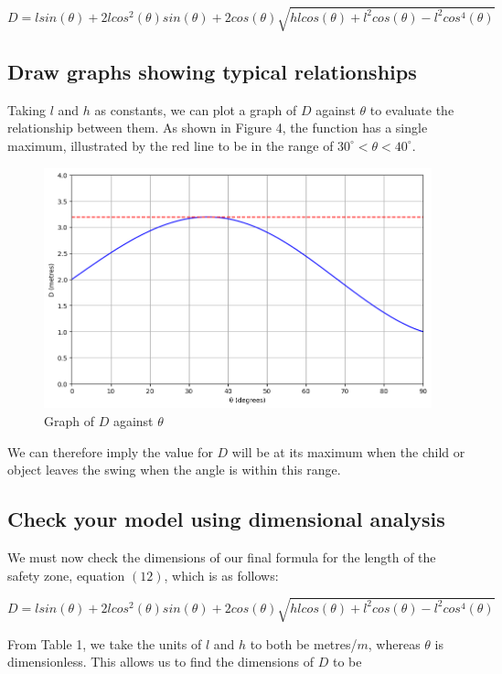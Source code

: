 \documentclass{article}
\begin{document}
\begin{equation}
    D = lsin(\theta) + 2lcos^2(\theta)sin(\theta) + 2cos(\theta)\sqrt{hlcos(\theta) + l^2cos(\theta) - l^2cos^4(\theta)}
\end{equation}

\subsection*{Draw graphs showing typical relationships}
Taking $l$ and $h$ as constants, we can plot a graph of $D$ against $\theta$ to evaluate the relationship between them. As shown in Figure 4, the function has a single maximum, illustrated by the red line to be in the range of $30^\circ < \theta < 40^\circ$.

\begin{figure}[H]
    \centering
    \includegraphics[width=0.70\linewidth]{Fig 4.png}
    \caption{Graph of $D$ against $\theta$ }
    \label{fig: Graph}
\end{figure}

We can therefore imply the value for $D$ will be at its maximum when the child or object leaves the swing when the angle is within this range.

\subsection*{Check your model using dimensional analysis}

We must now check the dimensions of our final formula for the length of the safety zone, equation $(12)$, which is as follows:

\[D = lsin(\theta) + 2lcos^2(\theta)sin(\theta) + 2cos(\theta)\sqrt{hlcos(\theta) + l^2cos(\theta) - l^2cos^4(\theta)}\]

From Table 1, we take the units of $l$ and $h$ to both be metres/$m$, whereas $\theta$ is dimensionless. This allows us to find the dimensions of $D$ to be
\end{document}

